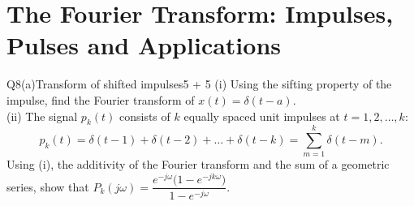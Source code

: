 \renewcommand{\teacherTag}{QUESTION 8 \textbullet\ 35 MARKS}
\chapter{The Fourier Transform: Impulses, Pulses and Applications}

\begin{qcard}{Q8(a)}{Transform of shifted impulses}{5 + 5}
(i) Using the sifting property of the impulse, find the Fourier transform of $x(t)=\delta(t-a)$.\\
(ii) The signal $p_k(t)$ consists of $k$ equally spaced unit impulses at $t=1,2,\dots,k$:
\[p_k(t)=\delta(t-1)+\delta(t-2)+\dots+\delta(t-k)=\sum_{m=1}^k\delta(t-m).\]
Using (i), the additivity of the Fourier transform and the sum of a geometric series, show that $P_k(j\omega)=\dfrac{e^{-j\omega}\big(1-e^{-jk\omega}\big)}{1-e^{-j\omega}}$.
\end{qcard}
